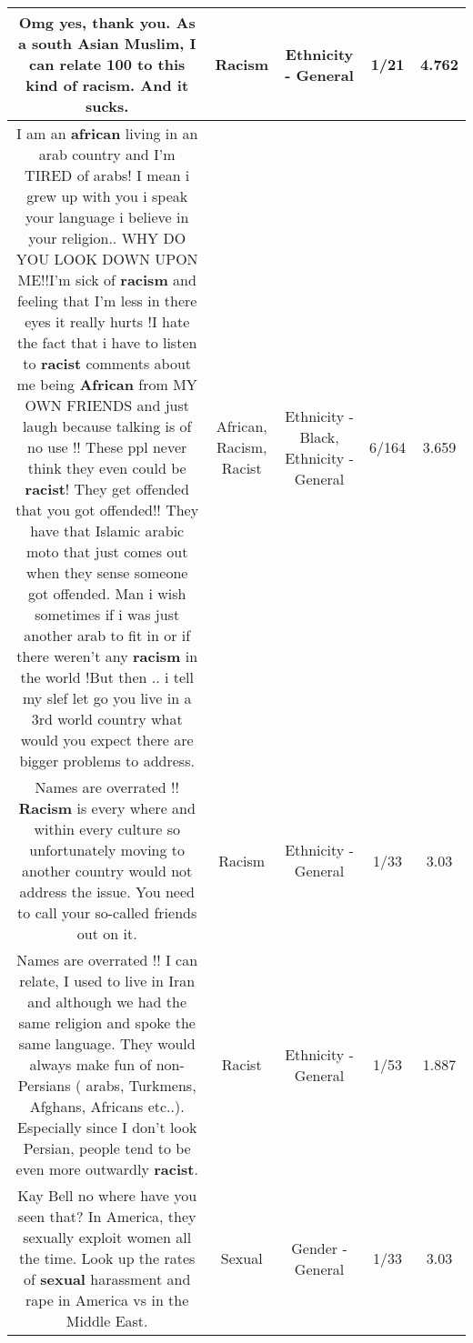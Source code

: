 \documentclass[11pt]{article}
\newlength\mylength
\begin{document}
\begin{center}
\begin{longtable}{|C{.65\mylength}|C{.30\mylength}|C{.12\mylength}|C{.12\mylength}|C{.12\mylength}|}
  \small Omg yes, thank you. As a south Asian Muslim, I can relate 100 to this kind of \textbf{racism}. And it sucks.\normalsize   & Racism & Ethnicity - General & 1/21 & 4.762 \\  \hline
  \small I am an \textbf{african} living in an arab country and I'm TIRED of arabs! I mean i grew up with you i speak your language i believe in your religion.. WHY DO YOU LOOK DOWN UPON ME!!I'm sick of \textbf{racism} and feeling that I'm less in there eyes it really hurts !I hate the fact that i have to listen to \textbf{racist} comments about me being \textbf{African} from MY OWN FRIENDS and just laugh because talking is of no use !! These ppl never think they even could be \textbf{racist}! They get offended that you got offended!! They have that Islamic arabic moto that just comes out when they sense someone got offended. Man i wish sometimes if i was just another arab to fit in or if there weren't any \textbf{racism} in the world !But then .. i tell my slef let go you live in a 3rd world country what would you expect there are bigger problems to address.\normalsize   & African, Racism, Racist & Ethnicity - Black, Ethnicity - General & 6/164 & 3.659 \\  \hline
  \small Names are overrated !! \textbf{Racism} is every where and within every culture so unfortunately moving to another country would not address the issue. You need to call your so-called friends out on it.\normalsize   & Racism & Ethnicity - General & 1/33 & 3.03 \\  \hline
  \small Names are overrated !!  I can relate, I used to live in Iran and although we had the same religion and spoke the same language. They would always make fun of non- Persians ( arabs, Turkmens, Afghans, Africans etc..). Especially since I don't look Persian, people tend to be even more outwardly \textbf{racist}.\normalsize   & Racist & Ethnicity - General & 1/53 & 1.887 \\  \hline
  \small Kay Bell no where have you seen that? In America, they sexually exploit women all the time. Look up the rates of \textbf{sexual} harassment and rape in America vs in the Middle East.\normalsize   & Sexual & Gender - General & 1/33 & 3.03 \\  \hline

\end{longtable}
\end{center}
\end{document}
